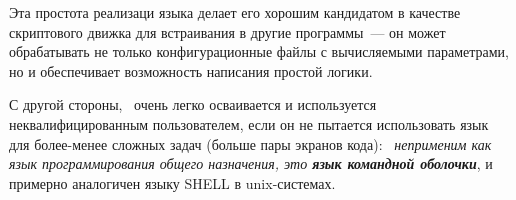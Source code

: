 Эта простота реализаци языка делает его хорошим кандидатом в качестве
скриптового движка для встраивания в другие программы\ --- он может обрабатывать
не только конфигурационные файлы с вычисляемыми параметрами, но и обеспечивает
возможность написания простой логики.

С другой стороны, \F\ очень легко осваивается и используется неквалифицированным
пользователем, если он не пытается использовать язык для более-менее сложных
задач (больше пары экранов кода): \emph{\F\ неприменим как язык программирования
общего назначения, это \textbf{язык командной оболочки}}, и примерно аналогичен
языку SHELL в unix-системах.


